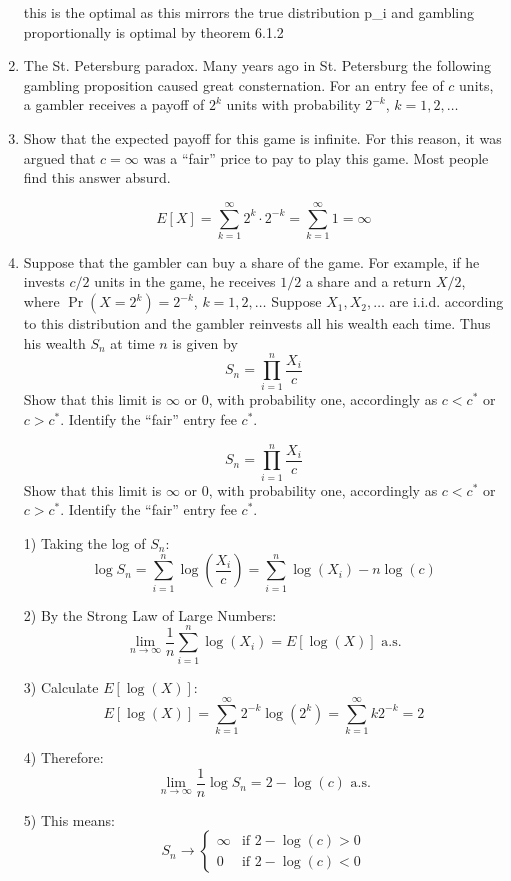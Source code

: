 \documentclass{article}
\begin{document}
\begin{enumerate}
    this is the optimal as this mirrors the true distribution p\_i and gambling proportionally is optimal by theorem 6.1.2

    \item The St. Petersburg paradox. Many years ago in St. Petersburg the following gambling proposition caused great consternation. For an entry fee of $c$ units, a gambler receives a payoff of $2^k$ units with probability $2^{-k}$, $k = 1,2,\ldots$

    \item Show that the expected payoff for this game is infinite. For this reason, it was argued that $c = \infty$ was a ``fair'' price to pay to play this game. Most people find this answer absurd.
    
    \[
        E[X] = \sum_{k=1}^{\infty} 2^k \cdot 2^{-k} = \sum_{k=1}^{\infty} 1 = \infty
    \]
    

    \item Suppose that the gambler can buy a share of the game. For example, if he invests $c/2$ units in the game, he receives $1/2$ a share and a return $X/2$, where $\Pr(X = 2^k) = 2^{-k}$, $k = 1,2,\ldots$ Suppose $X_1, X_2,\ldots$ are i.i.d. according to this distribution and the gambler reinvests all his wealth each time. Thus his wealth $S_n$ at time $n$ is given by
    \[
        S_n = \prod_{i=1}^n \frac{X_i}{c}
    \]
    Show that this limit is $\infty$ or $0$, with probability one, accordingly as $c < c^*$ or $c > c^*$. Identify the ``fair'' entry fee $c^*$.

    \[
        S_n = \prod_{i=1}^n \frac{X_i}{c}
    \]
    Show that this limit is $\infty$ or $0$, with probability one, accordingly as $c < c^*$ or $c > c^*$. Identify the ``fair'' entry fee $c^*$.

    1) Taking the log of $S_n$:
    \[
        \log S_n = \sum_{i=1}^n \log(\frac{X_i}{c}) = \sum_{i=1}^n \log(X_i) - n\log(c)
    \]

    2) By the Strong Law of Large Numbers:
    \[
        \lim_{n \to \infty} \frac{1}{n}\sum_{i=1}^n \log(X_i) = E[\log(X)] \text{ a.s.}
    \]

    3) Calculate $E[\log(X)]$:
    \[
        E[\log(X)] = \sum_{k=1}^{\infty} 2^{-k} \log(2^k) = \sum_{k=1}^{\infty} k2^{-k} = 2
    \]

    4) Therefore:
    \[
        \lim_{n \to \infty} \frac{1}{n}\log S_n = 2 - \log(c) \text{ a.s.}
    \]

    5) This means:
    \[
        S_n \to \begin{cases}
            \infty & \text{if } 2 - \log(c) > 0 \\
            0 & \text{if } 2 - \log(c) < 0
        \end{cases}
    \]


\end{enumerate}
\end{document}
